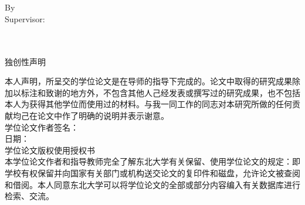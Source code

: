 {\begin{titlepage}
\begin{center}
{\begin{center}
{\begin{tabular}{rl}
            \end{tabular}
          }
        \end{center}
      }
\renewcommand{\baselinestretch}{1.27}
      \vspace{1.84cm}
      {
     	\sihao\song
             \@cNEU\\
        \@tmdate
      }
    \end{center}
    \cleardoublepage
    \newpage
    \thispagestyle{empty}
    \vspace{1.2cm}
    \begin{center}
          {\erhao\textbf{\@etitle}\\}
          \vspace{2.0cm}
          {By \@eauthor \\}
          \vspace{2.0cm}
          {Supervisor: \@esupervisor \\}
      \vspace{8.6cm}
     	\sanhao \textbf{\@eNEU\\}
        \vspace{0.34cm}
        \textbf{\@edate}\\
    \end{center}
\cleardoublepage
    \newpage
    \thispagestyle{empty}
    \begin{flushleft}
      {\center\erhao\hei 独创性声明\\}
        \setcounter{page}{1}
    \vspace{0.6cm}
    {
      \sihao\song
    \hspace{0.85cm} 本人声明，所呈交的学位论文是在导师的指导下完成的。论文中取得的研究成果除加以标注和致谢的地方外，不包含其他人己经发表或撰写过的研究成果，也不包括本人为获得其他学位而使用过的材料。与我一同工作的同志对本研究所做的任何贡献均己在论文中作了明确的说明并表示谢意。\\
      \vspace{0.5cm}
    }
    {\hspace{8.3cm}学位论文作者签名：\\\vspace{0.35cm}\hspace{8.3cm}日\hspace{1.1cm}期：\\}
    \vspace{1.2cm}
    {\center\erhao\hei 学位论文版权使用授权书\\}
    \vspace{0.6cm}
    \sihao\song
     \hspace{0.85cm} 本学位论文作者和指导教师完全了解东北大学有关保留、使用学位论文的规定：即学校有权保留并向国家有关部门或机构送交论文的复印件和磁盘，允许论文被查阅和借阅。本人同意东北大学可以将学位论文的全部或部分内容编入有关数据库进行检索、交流。


\end{flushleft}
\end{titlepage}}
